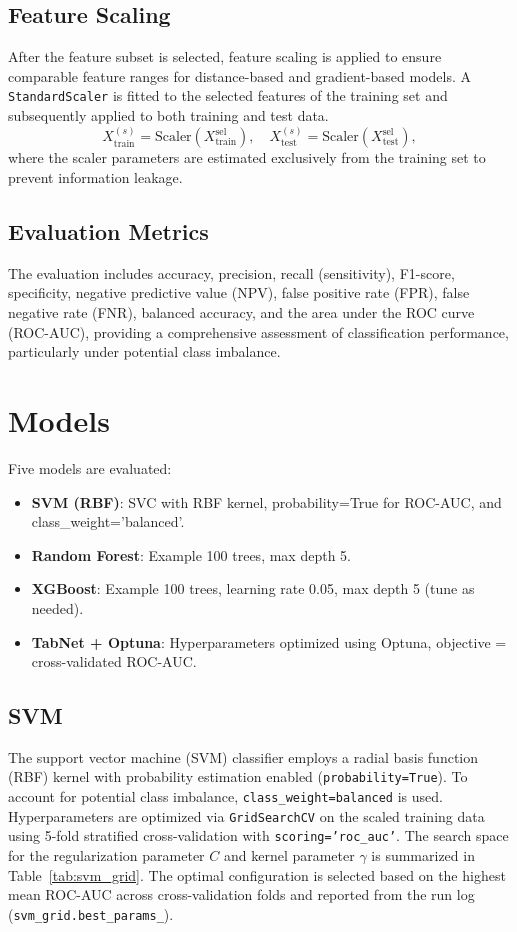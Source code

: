 \documentclass[10pt,conference]{IEEEtran}
\begin{document}
\subsection{Feature Scaling}
After the feature subset is selected,
feature scaling is applied to ensure comparable feature ranges for
distance-based and gradient-based models.
A \texttt{StandardScaler} is fitted to the selected features of the training
set and subsequently applied to both training and test data.
\[
X_{\text{train}}^{(s)} = \text{Scaler}(X_{\text{train}}^{\text{sel}}), \quad
X_{\text{test}}^{(s)} = \text{Scaler}(X_{\text{test}}^{\text{sel}}),
\]
where the scaler parameters are estimated exclusively from the training set
to prevent information leakage.


\subsection{Evaluation Metrics}
The evaluation includes accuracy, precision, recall (sensitivity), F1-score,
specificity, negative predictive value (NPV), false positive rate (FPR),
false negative rate (FNR), balanced accuracy, and the area under the ROC curve
(ROC-AUC), providing a comprehensive assessment of classification performance,
particularly under potential class imbalance.



\section{Models}

Five models are evaluated:
\begin{itemize}
\item \textbf{SVM (RBF)}: SVC with RBF kernel, probability=True for ROC-AUC, and class\_weight='balanced'.
\item \textbf{Random Forest}: Example 100 trees, max depth 5.
\item \textbf{XGBoost}: Example 100 trees, learning rate 0.05, max depth 5 (tune as needed).
\item \textbf{TabNet + Optuna}: Hyperparameters optimized using Optuna, objective = cross-validated ROC-AUC.
\end{itemize}


\subsection{SVM}
The support vector machine (SVM) classifier employs a radial basis function
(RBF) kernel with probability estimation enabled (\texttt{probability=True}).
To account for potential class imbalance, \texttt{class\_weight=balanced} is
used. Hyperparameters are optimized via \texttt{GridSearchCV} on the scaled
training data using 5-fold stratified cross-validation with
\texttt{scoring='roc\_auc'}.
The search space for the regularization parameter $C$ and kernel parameter
$\gamma$ is summarized in Table~\ref{tab:svm_grid}. The optimal configuration
is selected based on the highest mean ROC-AUC across cross-validation folds
and reported from the run log (\texttt{svm\_grid.best\_params\_}).
\end{document}
